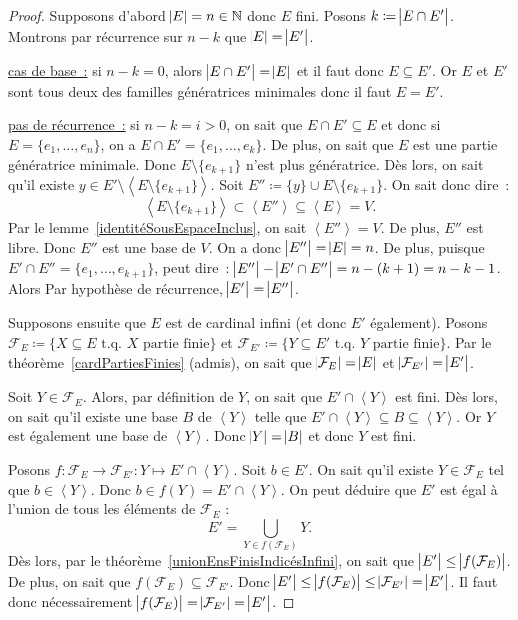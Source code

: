 \documentclass{article}
\newcommand{\N}{\mathbb N}
\newcommand{\eng}[1]{\left\langle#1\right\rangle}
\newcommand{\tq}{\textrm{ t.q. }}
\theoremstyle{definition}
\theoremstyle{remark}
\begin{document}
		\begin{proof} Supposons d'abord $\abs E = n \in \N$ donc $E$ fini. Posons $k \coloneqq \abs {E \cap E'}$. Montrons par récurrence sur $n-k$ que
		$\abs E = \abs {E'}$.

		\underline{cas de base~:} si $n-k = 0$, alors $\abs {E \cap E'} = \abs {E}$ et il faut donc $E \subseteq E'$. Or $E$ et $E'$ sont tous deux des familles
		génératrices minimales donc il faut $E = E'$.

		\underline {pas de récurrence~:} si $n-k = i > 0$, on sait que $E \cap E' \subseteq E$ et donc si $E = \{e_1, \dotsc, e_n\}$, on a
		$E \cap E' = \{e_1, \dotsc, e_k\}$. De plus, on sait que $E$ est une partie génératrice minimale. Donc $E \setminus \{e_{k+1}\}$ n'est plus génératrice.
		Dès lors, on sait qu'il existe $y \in E' \setminus \eng {E \setminus \{e_{k+1}\}}$. Soit $E'' \coloneqq \{y\} \cup E \setminus \{e_{k+1}\}$. On sait donc dire~:
		\[\eng {E \setminus \{e_{k+1}\}} \subset \eng {E''} \subseteq \eng E = V.\] Par le lemme~\ref{identitéSousEspaceInclus}, on sait $\eng {E''} = V$. De plus, $E''$
		est libre. Donc $E''$ est une base de $V$. On a donc $\abs {E''} = \abs E = n$. De plus, puisque $E' \cap E'' = \{e_1, \dotsc, e_{k+1}\}$, peut dire~:
		$\abs {E''} - \abs {E' \cap E''} = n - (k+1) = n-k-1$. Alors Par hypothèse de récurrence, $\abs {E'} = \abs {E''}$.

		Supposons ensuite que $E$ est de cardinal infini (et donc $E'$ également). Posons $\mathcal F_E \coloneqq \{X \subseteq E \tq X \text{ partie finie}\}$ et
		$\mathcal F_{E'} \coloneqq \{Y \subseteq E' \tq Y \text{ partie finie}\}$. Par le théorème~\ref{cardPartiesFinies} (admis), on sait que
		$\abs {\mathcal F_E} = \abs E$ et $\abs {\mathcal F_{E'}} = \abs {E'}$.

		Soit $Y \in \mathcal F_E$. Alors, par définition de $Y$, on sait que $E' \cap \eng Y$ est fini. Dès lors, on sait qu'il existe une base $B$ de $\eng Y$
		telle que $E' \cap \eng Y \subseteq B \subseteq \eng Y$. Or $Y$ est également une base de $\eng Y$. Donc $\abs Y = \abs B$ et donc $Y$ est fini.

		Posons $f : \mathcal F_E \to \mathcal F_{E'} : Y \mapsto E' \cap \eng Y$. Soit $b \in E'$. On sait qu'il existe $Y \in \mathcal F_E$ tel que $b \in \eng Y$.
		Donc $b \in f(Y) = E' \cap \eng Y$. On peut déduire que $E'$ est égal à l'union de tous les éléments de $\mathcal F_E$ :
		\[E' = \bigcup_{Y \in f(\mathcal F_E)}Y.\] Dès lors, par le théorème~\ref{unionEnsFinisIndicésInfini}, on sait que $\abs {E'} \leq \abs {f(\mathcal F_E)}$.
		De plus, on sait que $f(\mathcal F_E) \subseteq \mathcal F_{E'}$. Donc $\abs {E'} \leq \abs {f(\mathcal F_E)} \leq \abs {\mathcal F_{E'}} = \abs {E'}$.
		Il faut donc nécessairement $\abs {f(\mathcal F_{E})} = \abs {\mathcal F_{E'}} = \abs {E'}$.


\end{proof}
\end{document}

